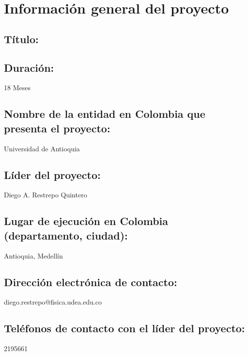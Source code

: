 
\section{Información general del proyecto}
\subsection{Título:}
\proytitulo
\subsection{Duración: }
18 Meses
\subsection{Nombre de la entidad en Colombia que presenta el proyecto:}
Universidad de Antioquia
\subsection{Líder del proyecto: }
Diego A. Restrepo Quintero
\subsection{Lugar de ejecución en Colombia (departamento, ciudad): }
Antioquia, Medellín
\subsection{Dirección electrónica de contacto:}
diego.restrepo@fisica.udea.edu.co
\subsection{Teléfonos de contacto con el líder del proyecto: }
2195661


